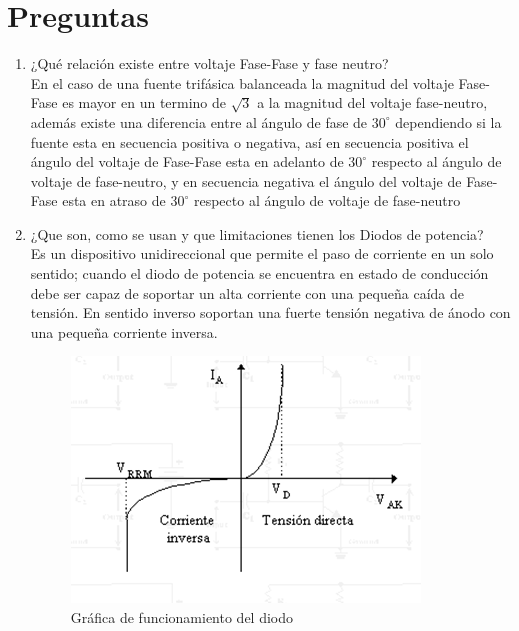 \documentclass[twocolumn]{IEEEtran}
\begin{document}
\section{Preguntas}
\begin{enumerate}
 \item ¿Qué relación existe entre voltaje Fase-Fase y fase neutro?\\
En el caso de una fuente trifásica balanceada la magnitud del voltaje Fase-Fase es mayor en un termino de $\sqrt{3}$ a la magnitud del voltaje fase-neutro, además existe una diferencia entre al ángulo de fase de $30^\circ$ dependiendo si la fuente esta en secuencia positiva o negativa, así en secuencia positiva el ángulo del voltaje de Fase-Fase esta en adelanto de $30^\circ$ respecto al ángulo de voltaje de fase-neutro, y en secuencia negativa el ángulo del voltaje de Fase-Fase esta en atraso de $30^\circ$ respecto al ángulo de voltaje de fase-neutro
 \item ¿Que son, como se usan y que limitaciones tienen los Diodos de potencia?\\
Es un dispositivo unidireccional que permite el paso de corriente en un solo sentido; cuando el diodo de potencia se encuentra en estado de conducción debe ser capaz de soportar un alta corriente con una pequeña caída de tensión. En sentido inverso soportan una fuerte tensión negativa de ánodo con una pequeña corriente inversa.
\begin{figure}[H]
	\centering
		\includegraphics[scale=0.7]{diodo.png}
	\caption{Gráfica de funcionamiento del diodo}
	\label{fig20}
\end{figure}


\end{enumerate}
\end{document}

